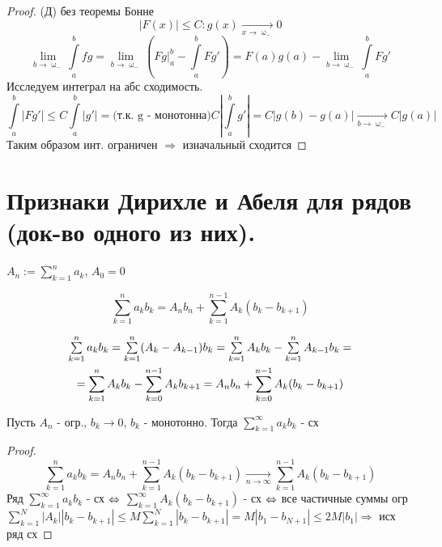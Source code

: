 \documentclass[11pt, fleqn]{article}
\begin{document}
\begin{Property}[3]
\begin{Property}[4]
\begin{Property}[2, аддитивность]
\begin{Proof}
\begin{proof}
    (Д) без теоремы Бонне
    \[|F(x)| \leqslant C: g(x) \underset{x \rightarrow \upomega_-}{\rightarrow} 0\]
    \[\lim\limits_{b \rightarrow \upomega_-} \int\limits_a^b f g = \lim\limits_{b \rightarrow \upomega_-} (F g |_a^b - \int\limits_a^b F g') = F(a) g(a) - \lim\limits_{b \rightarrow \upomega_-} \int\limits_a^b F g'\]
    Исследуем интеграл на абс сходимость. 
    \[\int\limits_a^b |F g'| \leqslant C \int\limits_a^b |g'| = \text{(т.к. g - монотонна)} C |\int\limits_a^b g'| = C |g(b) - g(a)| \underset{b \rightarrow \upomega_-}{\rightarrow} C |g(a)|\]
    Таким образом инт. ограничен $\Rightarrow$ изначальный сходится
\end{proof}

\newpage
\section{Признаки Дирихле и Абеля для рядов (док-во одного из них).}

\begin{definition}
    $A_n := \sum\limits_{k=1}^n a_k$, $A_0=0$
\end{definition}

\begin{Theorem} 
    \[\sum\limits_{k=1}^n a_k b_k = A_n b_n + \sum\limits_{k=1}^{n-1} A_k (b_k - b_{k+1})\]
\end{Theorem}

\begin{Proof}
    \begin{multline*}
        $$\sum\limits_{k=1}^n a_k b_k = \sum\limits_{k=1}^n (A_k - A_{k-1}) b_k = \sum\limits_{k=1}^n A_k b_k - \sum\limits_{k=1}^n A_{k-1} b_k =\\
        =\sum\limits_{k=1}^n A_k b_k - \sum\limits_{k=0}^{n-1} A_k b_{k+1} = A_n b_n + \sum\limits_{k=0}^{n-1} A_k (b_k - b_{k+1})$$
    \end{multline*}
\end{Proof}

\begin{theorem} 
    Пусть $A_n$ - огр., $b_k \rightarrow 0$, $b_k$ - монотонно. Тогда $\sum\limits_{k=1}^\infty a_k b_k$ - сх
\end{theorem}

\begin{proof}
    \[\sum\limits_{k=1}^n a_k b_k = A_n b_n + \sum\limits_{k=1}^{n-1} A_k (b_k - b_{k+1}) \underset{n \rightarrow \infty}{\rightarrow} \sum\limits_{k=1}^{n-1} A_k (b_k - b_{k+1})\]
    Ряд $\sum\limits_{k=1}^\infty a_k b_k$ - сх $\Leftrightarrow$ $\sum\limits_{k=1}^\infty A_k (b_k - b_{k+1})$ - сх $\Leftrightarrow$ все частичные суммы огр
    \\
    $\sum\limits_{k=1}^N |A_k| |b_k - b_{k+1}| \leqslant M \sum\limits_{k=1}^N |b_k - b_{k+1}| = M |b_1 - b_{N+1}| \leqslant 2 M |b_1| \Rightarrow$ исх ряд сх
\end{proof}


\end{Proof}
\end{Property}
\end{Property}
\end{Property}
\end{document}

